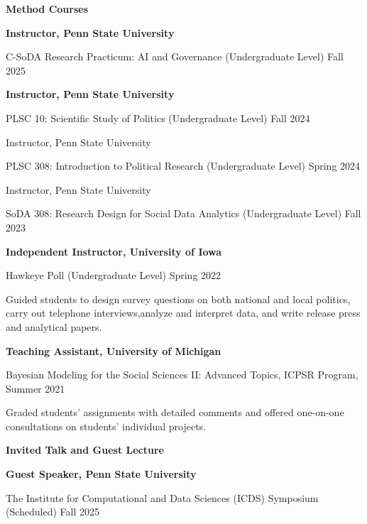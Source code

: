\documentclass[10.5pt,]{article}
\providecommand{\tightlist}{%
	\setlength{\itemsep}{0pt}\setlength{\parskip}{0pt}}
\renewenvironment{itemize}{
	\begin{list}{}{
			\setlength{\leftmargin}{1.5em}
		}
	}{
	\end{list}
}
\begin{document}
\begin{itemize}
\tightlist
\item
  \textbf{Method Courses}

  \begin{itemize}
  \tightlist
  \item
    \textbf{Instructor, Penn State University}
  \item
    C-SoDA Research Practicum: AI and Governance (Undergraduate Level)
    \hfill Fall 2025
  \item
    \textbf{Instructor, Penn State University}
  \item
    PLSC 10: Scientific Study of Politics (Undergraduate Level)
    \hfill Fall 2024
  \item
    Instructor, Penn State University
  \item
    PLSC 308: Introduction to Political Research (Undergraduate Level)
    \hfill Spring 2024
  \item
    Instructor, Penn State University
  \item
    SoDA 308: Research Design for Social Data Analytics (Undergraduate
    Level) \hfill Fall 2023
  \item
    \textbf{Independent Instructor, University of Iowa}
  \item
    Hawkeye Poll (Undergraduate Level) \hfill Spring 2022
  \item
    Guided students to design survey questions on both national and
    local politics, carry out telephone interviews,analyze and interpret
    data, and write release press and analytical papers.
  \item
    \textbf{Teaching Assistant, University of Michigan}
  \item
    Bayesian Modeling for the Social Sciences II: Advanced Topics, ICPSR
    Program, \hfill Summer 2021
  \item
    Graded students' assignments with detailed comments and offered
    one-on-one consultations on students' individual projects.
  \end{itemize}
\item
  \textbf{Invited Talk and Guest Lecture}

  \begin{itemize}
  \tightlist
  \item
    \textbf{Guest Speaker, Penn State University}
  \item
    The Institute for Computational and Data Sciences (ICDS) Symposium
    (Scheduled) \hfill Fall 2025


\end{itemize}
\end{itemize}
\end{document}

